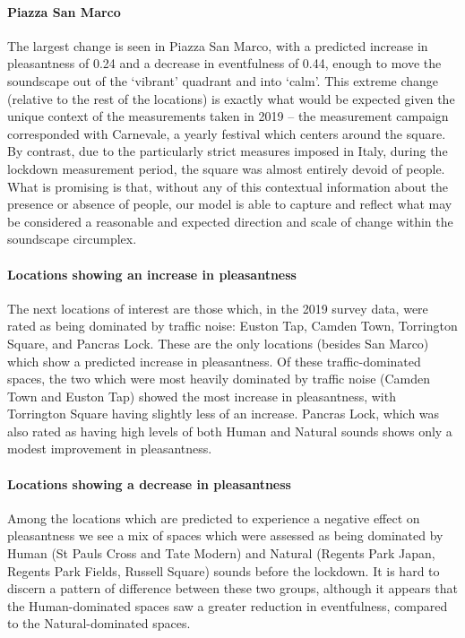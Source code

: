 \documentclass[
  authoryear,
  preprint,
  3p,
  onecolumn]{elsarticle}
\let\oldparagraph\paragraph
\renewcommand{\paragraph}[1]{\oldparagraph{#1}\mbox{}}
\begin{document}
\paragraph{Piazza San Marco}\label{piazza-san-marco}

The largest change is seen in Piazza San Marco, with a predicted
increase in pleasantness of 0.24 and a decrease in eventfulness of 0.44,
enough to move the soundscape out of the `vibrant' quadrant and into
`calm'. This extreme change (relative to the rest of the locations) is
exactly what would be expected given the unique context of the
measurements taken in 2019 -- the measurement campaign corresponded with
Carnevale, a yearly festival which centers around the square. By
contrast, due to the particularly strict measures imposed in Italy,
during the lockdown measurement period, the square was almost entirely
devoid of people. What is promising is that, without any of this
contextual information about the presence or absence of people, our
model is able to capture and reflect what may be considered a reasonable
and expected direction and scale of change within the soundscape
circumplex.

\paragraph{Locations showing an increase in
pleasantness}\label{locations-showing-an-increase-in-pleasantness}

The next locations of interest are those which, in the 2019 survey data,
were rated as being dominated by traffic noise: Euston Tap, Camden Town,
Torrington Square, and Pancras Lock. These are the only locations
(besides San Marco) which show a predicted increase in pleasantness. Of
these traffic-dominated spaces, the two which were most heavily
dominated by traffic noise (Camden Town and Euston Tap) showed the most
increase in pleasantness, with Torrington Square having slightly less of
an increase. Pancras Lock, which was also rated as having high levels of
both Human and Natural sounds shows only a modest improvement in
pleasantness.

\paragraph{Locations showing a decrease in
pleasantness}\label{locations-showing-a-decrease-in-pleasantness}

Among the locations which are predicted to experience a negative effect
on pleasantness we see a mix of spaces which were assessed as being
dominated by Human (St Pauls Cross and Tate Modern) and Natural (Regents
Park Japan, Regents Park Fields, Russell Square) sounds before the
lockdown. It is hard to discern a pattern of difference between these
two groups, although it appears that the Human-dominated spaces saw a
greater reduction in eventfulness, compared to the Natural-dominated
spaces.
\end{document}

